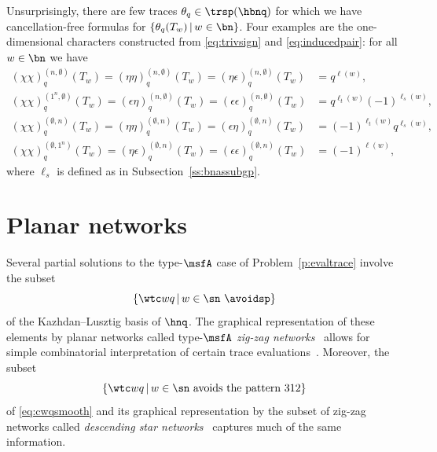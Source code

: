 Unsurprisingly,
there are few traces $\theta_q \in \trsp(\hbnq)$
for which we have cancellation-free formulas
for $\{\theta_q(T_w) \,|\, w \in \bn \}$.
Four examples are the one-dimensional characters
constructed from \eqref{eq:trivsign} and
\eqref{eq:inducedpair}: for all $w \in \bn$ we have
\begin{equation*}
  \begin{aligned}
(\chi\chi)^{(n,\emptyset)}_q(T_w) =
(\eta\eta)^{(n,\emptyset)}_q(T_w) =
(\eta\epsilon)^{(n,\emptyset)}_q(T_w) &= q^{\ell(w)},\\
(\chi\chi)^{(1^n,\emptyset)}_q(T_w) =
(\epsilon\eta)^{(n,\emptyset)}_q(T_w) =
(\epsilon\epsilon)^{(n,\emptyset)}_q(T_w) &= q^{\ell_t(w)}(-1)^{\ell_s(w)},\\
(\chi\chi)^{(\emptyset,n)}_q(T_w) =
(\eta\eta)^{(\emptyset,n)}_q(T_w) =
(\epsilon\eta)^{(\emptyset,n)}_q(T_w) &= (-1)^{\ell_t(w)}q^{\ell_s(w)},\\
(\chi\chi)^{(\emptyset,1^n)}_q(T_w) =
(\eta\epsilon)^{(\emptyset,n)}_q(T_w) =
(\epsilon\epsilon)^{(\emptyset,n)}_q(T_w) &= (-1)^{\ell(w)},
\end{aligned}
\end{equation*}
where $\ell_s$ is defined as in Subsection~\ref{ss:bnassubgp}.

\section{Planar networks}\label{s:planarnet}


Several partial solutions to the type-$\msfA$ case of Problem~\ref{p:evaltrace}
involve
the subset
\begin{equation}\label{eq:cwqsmooth}
  \{ \wtc wq \,|\, w \in \sn \text{ \avoidsp} \}
\end{equation}
of the Kazhdan--Lusztig basis of $\hnq$.
The graphical representation of these elements
by
planar networks
called type-$\msfA$ {\em zig-zag networks}~\cite[\S 3]{SkanNNDCB}
allows for simple combinatorial interpretation of certain trace
evaluations~\cite[\S 5--10]{SkanNNDCB}.
Moreover, the subset
\begin{equation}\label{eq:cwqcodom}
  \{ \wtc wq \,|\, w \in \sn \text{ avoids the pattern } 312 \}
\end{equation}
of \eqref{eq:cwqsmooth} 
and its graphical representation by the subset of zig-zag networks
called {\em descending star networks}~\cite{SkanNNDCB}
captures much of the same information.

